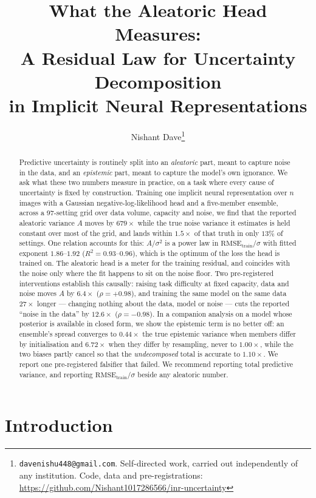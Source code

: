\documentclass[10pt]{article}
\title{\bf What the Aleatoric Head Measures:\\A Residual Law for Uncertainty Decomposition\\in Implicit Neural Representations}
\author{Nishant Dave\thanks{\texttt{davenishu448@gmail.com}. Self-directed work, carried out
independently of any institution. Code, data and pre-registrations:
\url{https://github.com/Nishant1017286566/inr-uncertainty}}}
\date{}
\begin{document}
\maketitle

\begin{abstract}
\noindent
Predictive uncertainty is routinely split into an \emph{aleatoric} part, meant to capture
noise in the data, and an \emph{epistemic} part, meant to capture the model's own ignorance.
We ask what these two numbers measure in practice, on a task where every cause of
uncertainty is fixed by construction. Training one implicit neural representation over
$n$ images with a Gaussian negative-log-likelihood head and a five-member ensemble, across a
97-setting grid over data volume, capacity and noise, we find that the reported aleatoric
variance $A$ moves by $679\times$ while the true noise variance it estimates is held
constant over most of the grid, and lands within $1.5\times$ of that truth in only $13\%$ of
settings. One relation accounts for this: $A/\sigma^2$ is a power law in
$\mathrm{RMSE}_{\mathrm{train}}/\sigma$ with fitted exponent $1.86$--$1.92$
($R^2 = 0.93$--$0.96$), which is the optimum of the loss the head is trained on. The
aleatoric head is a meter for the training residual, and coincides with the noise only where
the fit happens to sit on the noise floor. Two pre-registered interventions establish this
causally: raising task difficulty at fixed capacity, data and noise moves $A$ by $6.4\times$
($\rho=+0.98$), and training the same model on the same data $27\times$ longer --- changing
nothing about the data, model or noise --- cuts the reported ``noise in the data'' by
$12.6\times$ ($\rho=-0.98$). In a companion analysis on a model whose posterior is available
in closed form, we show the epistemic term is no better off: an ensemble's spread converges
to $0.44\times$ the true epistemic variance when members differ by initialisation and
$6.72\times$ when they differ by resampling, never to $1.00\times$, while the two biases
partly cancel so that the \emph{undecomposed} total is accurate to $1.10\times$. We report
one pre-registered falsifier that failed. We recommend reporting total predictive variance,
and reporting $\mathrm{RMSE}_{\mathrm{train}}/\sigma$ beside any aleatoric number.
\end{abstract}

\section{Introduction}
\end{document}
